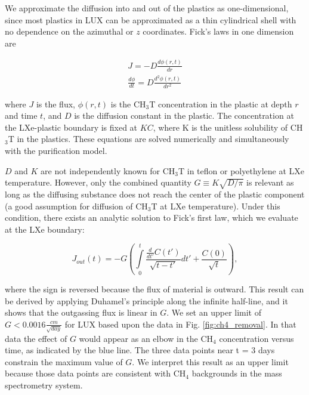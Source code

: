 We approximate the diffusion into and out of the plastics as one-dimensional, since most plastics in LUX can be approximated as a thin cylindrical shell with no dependence on the azimuthal or $z$ coordinates.  Fick's laws in one dimension are

\begin{align}
J=-D\frac{d \phi(r,t)}{d r}  \\
\frac{d \phi}{d t} = D \frac{d^2 \phi(r,t)}{d r^2} 
\end{align}

\noindent 
where $J$ is the flux, $\phi(r,t)$ is the CH$_3$T  concentration in the plastic at depth $r$ and time $t$, and $D$ is the diffusion constant in the plastic. The concentration at the LXe-plastic boundary is fixed at $KC$, where K is the unitless solubility of CH$_3$T in the plastics. These equations are solved numerically and simultaneously with the purification model. 

$D$ and $K$ are not independently known for CH$_3$T in teflon or polyethylene at LXe temperature. However, only the combined quantity $G \equiv K \sqrt{ D/ \pi }$ is relevant as long as the diffusing substance does not reach the center of the plastic component (a good assumption for diffusion of CH$_3$T at LXe temperature). Under this condition, there exists an analytic solution to Fick's first law, which we evaluate at the LXe boundary:


\begin{equation}
J_{out}(t)= - G\left( \int \limits_0^t \frac{\frac{d}{dt'}C(t')}{\sqrt{t-t'}} dt' + \frac{C(0)}{\sqrt{t}}\right),
\end{equation}

\noindent
where the sign is reversed because the flux of material is outward. This result can be derived by applying Duhamel's principle along the infinite half-line, and it shows that the outgassing flux is linear in $G$. We set an upper limit of $G<0.0016 \frac{cm}{\sqrt{day}}$ for LUX based upon the data in Fig. \ref{fig:ch4_removal}. In that data the effect of $G$ would appear as an elbow in the CH$_4$ concentration versus time, as indicated by the blue line. The three data points near t = 3 days constrain the maximum value of $G$. We interpret this result as an upper limit because those data points are consistent with CH$_4$ backgrounds in the mass spectrometry system.

